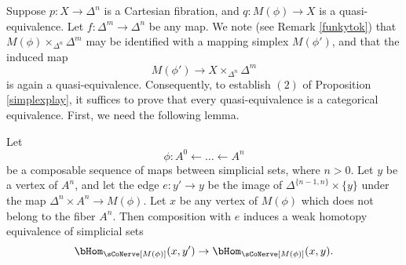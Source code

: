 Suppose $p: X \rightarrow \Delta^n$ is a Cartesian fibration,
and $q: M(\phi) \rightarrow X$ is a quasi-equivalence. 
Let $f: \Delta^m \rightarrow \Delta^n$ be any
map. We note (see Remark \ref{funkytok}) that $M(\phi)
\times_{\Delta^n} \Delta^m$ may be identified with a mapping
simplex $M(\phi')$, and that the induced map
$$ M(\phi') \rightarrow X \times_{\Delta^n} \Delta^m$$ is again a quasi-equivalence.
Consequently, to establish $(2)$ of Proposition \ref{simplexplay}, it suffices to prove
that every quasi-equivalence is a categorical equivalence. First, we need the following lemma.

\begin{lemma}\label{coraveg}
Let $$ \phi: A^0 \leftarrow \ldots \leftarrow A^n$$
be a composable sequence of maps between simplicial sets, where $n > 0$. Let $y$ be
a vertex of $A^n$, and let the edge $e: y' \rightarrow y$ be the image of
$\Delta^{ \{n-1, n\} } \times \{y\}$ under the map $\Delta^n \times A^n \rightarrow M(\phi)$.
Let $x$ be any vertex of $M(\phi)$ which does not belong to the fiber $A^n$. Then
composition with $e$ induces a weak homotopy equivalence of simplicial sets
$$ \bHom_{ \sCoNerve[M(\phi)] }(x,y') \rightarrow \bHom_{ \sCoNerve[M(\phi)] }(x,y).$$
\end{lemma}

